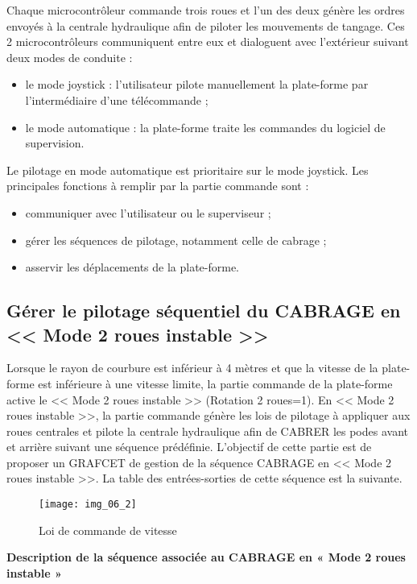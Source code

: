 Chaque microcontrôleur commande trois roues et l’un des deux génère les ordres envoyés à la centrale hydraulique afin de piloter les mouvements de tangage. Ces 2 microcontrôleurs communiquent entre eux et dialoguent avec l’extérieur suivant deux modes de conduite :
\begin{itemize}
\item le mode joystick : l’utilisateur pilote manuellement la plate-forme par l’intermédiaire d’une télécommande ;
\item le mode automatique : la plate-forme traite les commandes du logiciel de supervision.
\end{itemize}
Le pilotage en mode automatique est prioritaire sur le mode joystick. 
Les principales fonctions à remplir par la partie commande sont :
\begin{itemize}
\item communiquer avec l’utilisateur ou le superviseur ;
\item gérer les séquences de pilotage, notamment celle de cabrage ;
\item asservir les déplacements de la plate-forme.
\end{itemize}
\fi

\subsection{Gérer le pilotage séquentiel du CABRAGE en << Mode 2 roues instable >>}

\ifprof
\else

Lorsque le rayon de courbure est inférieur à 4 mètres et que la vitesse de la plate-forme est inférieure à une vitesse
limite, la partie commande de la plate-forme active le << Mode 2 roues instable >> (Rotation 2 roues=1). En << Mode 2 roues instable >>, la partie commande génère les lois de pilotage à appliquer aux roues centrales et pilote la centrale hydraulique afin de CABRER les podes avant et arrière suivant une séquence prédéfinie.
L’objectif de cette partie est de proposer un GRAFCET de gestion de la
séquence CABRAGE en << Mode 2 roues instable >>. La table des
entrées-sorties de cette séquence est la suivante.

\begin{figure}[H]
\centering
\texttt{[image: img\_06\_2]}
\caption{Loi de commande de vitesse \label{img:06:2}}
\end{figure}

\textbf{Description de la séquence associée au CABRAGE en « Mode 2 roues instable »}

